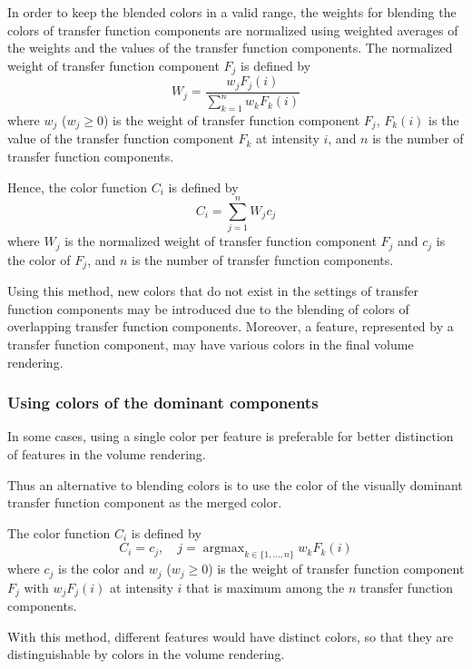 \documentclass[twoside,twocolumn,10pt]{article}
\DeclareMathOperator*{\argmax}{argmax} %
\begin{document}
In order to keep the blended colors in a valid range, the weights for blending the colors of transfer function components are normalized using weighted averages of the weights and the values of the transfer function components.
The normalized weight of transfer function component $ F_{j} $ is defined by
\[ W_{j}=
\frac{w_{j}F_{j}(i)}{\sum_{k=1}^{n}w_{k}F_{k}(i)}
\]
where $ w_{j} $ ($ w_{j} \geq 0 $) is the weight of transfer function component $ F_{j} $, $ F_{k}(i) $ is the value of the transfer function component $ F_{k} $ at intensity $ i $, and $ n $ is the number of transfer function components.

Hence, the color function $ C_{i} $ is defined by
\[ C_{i}=
\sum_{j=1}^{n} W_{j}c_{j}
\]
where $ W_{j} $ is the normalized weight of transfer function component $ F_{j} $ and $ c_{j} $ is the color of $ F_{j} $, and $ n $ is the number of transfer function components.

Using this method, new colors that do not exist in the settings of transfer function components may be introduced due to the blending of colors of overlapping transfer function components.
Moreover, a feature, represented by a transfer function component, may have various colors in the final volume rendering.

\subsubsection{Using colors of the dominant components}
In some cases, using a single color per feature is preferable for better distinction of features in the volume rendering.

Thus an alternative to blending colors is to use the color of the visually dominant transfer function component as the merged color.

The color function $ C_{i} $ is defined by
\[ 
C_{i} = c_{j},\quad j = \argmax_{k \in \{1,...,n\}} w_{k}F_{k}(i)
\]
where $ c_{j} $ is the color and $ w_{j} $ ($ w_{j} \geq 0 $) is the weight of transfer function component $ F_{j} $ with $ w_{j}F_{j}(i) $ at intensity $ i $ that is maximum among the $ n $ transfer function components.

With this method, different features would have distinct colors, so that they are distinguishable by colors in the volume rendering.
\end{document}
